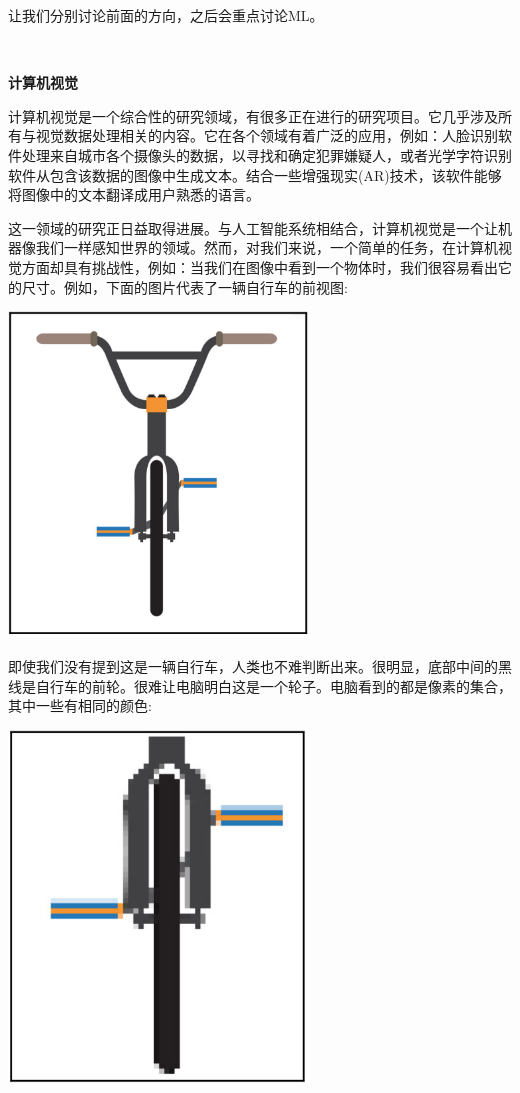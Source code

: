 让我们分别讨论前面的方向，之后会重点讨论ML。 \par

\noindent\textbf{}\ \par
\textbf{计算机视觉} \ \par
计算机视觉是一个综合性的研究领域，有很多正在进行的研究项目。它几乎涉及所有与视觉数据处理相关的内容。它在各个领域有着广泛的应用，例如：人脸识别软件处理来自城市各个摄像头的数据，以寻找和确定犯罪嫌疑人，或者光学字符识别软件从包含该数据的图像中生成文本。结合一些增强现实(AR)技术，该软件能够将图像中的文本翻译成用户熟悉的语言。 \par
这一领域的研究正日益取得进展。与人工智能系统相结合，计算机视觉是一个让机器像我们一样感知世界的领域。然而，对我们来说，一个简单的任务，在计算机视觉方面却具有挑战性，例如：当我们在图像中看到一个物体时，我们很容易看出它的尺寸。例如，下面的图片代表了一辆自行车的前视图: \par

\begin{center}
	\includegraphics[width=0.6\textwidth]{content/Section-3/Chapter-15/2}
\end{center}

即使我们没有提到这是一辆自行车，人类也不难判断出来。很明显，底部中间的黑线是自行车的前轮。很难让电脑明白这是一个轮子。电脑看到的都是像素的集合，其中一些有相同的颜色: \par

\begin{center}
	\includegraphics[width=0.6\textwidth]{content/Section-3/Chapter-15/3}
\end{center}

